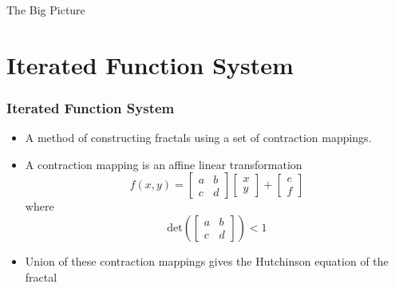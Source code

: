 \documentclass{beamer}
\begin{document}
\begin{frame}
    \centering
    \Large
    The Big Picture
\end{frame}

\section{Iterated Function System}
\begin{frame}
    \frametitle{Iterated Function System}
    \begin{itemize}
        \item A method of constructing fractals using a set of contraction mappings. 
        \item A contraction mapping is an affine linear transformation 
        \begin{equation*}
            f(x, y)=\left[ \begin{array}{ll}{a} & {b} \\ {c} & {d}\end{array}\right] \left[ \begin{array}{l}{x} \\ {y}\end{array}\right]+\left[ \begin{array}{l}{e} \\ {f}\end{array}\right]
        \end{equation*}
        where
        \begin{equation*}
            \text{det}\left(\left[ \begin{array}{ll}{a} & {b} \\ {c} & {d}\end{array}\right]\right) < 1
        \end{equation*}
        \item Union of these contraction mappings gives the Hutchinson equation of the fractal
    \end{itemize}
\end{frame}

\end{document}
